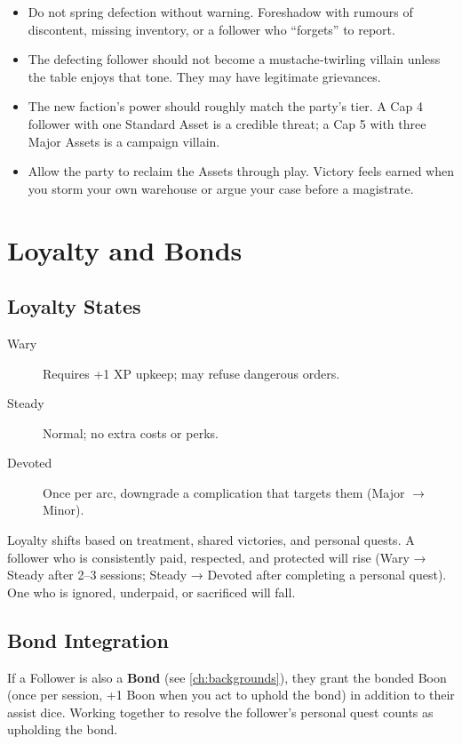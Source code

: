\begin{tcolorbox}[colback=red!5!white,colframe=red!75!black,title=GM Guidance: Rival Faction from Delegation]
\begin{itemize}
  \item Do not spring defection without warning. Foreshadow with rumours of discontent, missing inventory, or a follower who ``forgets'' to report.
  \item The defecting follower should not become a mustache‑twirling villain unless the table enjoys that tone. They may have legitimate grievances.
  \item The new faction's power should roughly match the party's tier. A Cap 4 follower with one Standard Asset is a credible threat; a Cap 5 with three Major Assets is a campaign villain.
  \item Allow the party to reclaim the Assets through play. Victory feels earned when you storm your own warehouse or argue your case before a magistrate.
\end{itemize}
\end{tcolorbox}

\section{Loyalty and Bonds}

\subsection*{Loyalty States}
\begin{description}
  \item[Wary] Requires +1 XP upkeep; may refuse dangerous orders.
  \item[Steady] Normal; no extra costs or perks.
  \item[Devoted] Once per arc, downgrade a complication that targets them (Major \(\rightarrow\) Minor). 
\end{description}
Loyalty shifts based on treatment, shared victories, and personal quests. A follower who is consistently paid, respected, and protected will rise (Wary → Steady after 2--3 sessions; Steady → Devoted after completing a personal quest). One who is ignored, underpaid, or sacrificed will fall.

\subsection*{Bond Integration}
If a Follower is also a \textbf{Bond} (see \ref{ch:backgrounds}), they grant the bonded Boon (once per session, +1 Boon when you act to uphold the bond) in addition to their assist dice. Working together to resolve the follower's personal quest counts as upholding the bond.

